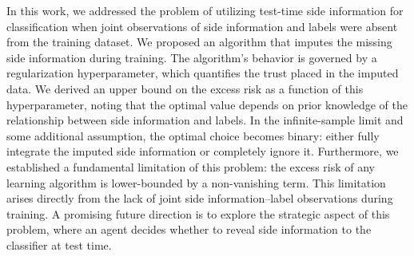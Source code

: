 \documentclass{article}
\numberwithin{equation}{section}
\theoremstyle{plain}
\theoremstyle{definition}
\theoremstyle{remark}
\begin{document}
In this work, we addressed the problem of utilizing test-time side information for classification when joint observations of side information and labels were absent from the training dataset. We proposed an algorithm that imputes the missing side information during training. The algorithm's behavior is governed by a regularization hyperparameter, which quantifies the trust placed in the imputed data. We derived an upper bound on the excess risk as a function of this hyperparameter, noting that the optimal value depends on prior knowledge of the relationship between side information and labels. In the infinite-sample limit and some additional assumption, the optimal choice becomes binary: either fully integrate the imputed side information or completely ignore it. Furthermore, we established a fundamental limitation of this problem: the excess risk of any learning algorithm is lower-bounded by a non-vanishing term. This limitation arises directly from the lack of joint side information–label observations during training. A promising future direction is to explore the strategic aspect of this problem, where an agent decides whether to reveal side information to the classifier at test time.




\newpage










\end{document}
